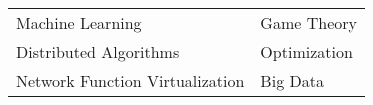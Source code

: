 \renewcommand{\arraystretch}{1.2}
\begin{tabular}{ll}
  Machine Learning                &Game Theory \\
  Distributed Algorithms          &Optimization \\
  Network Function Virtualization &Big Data \\
\end{tabular}
\medskip
